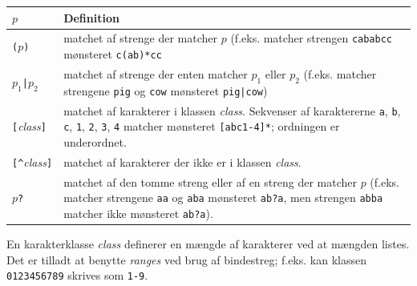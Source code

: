 \documentclass[rgb]{beamer}
\begin{document}
\begin{frame}[fragile]
\begin{footnotesize}

\begin{tabular}{lp{9cm}}
$p$ & {\bf Definition} \\[1ex] \hline
\texttt{(}$p$\texttt{)}    & matchet af strenge der matcher $p$ (f.eks. matcher strengen \texttt{cababcc} mønsteret \texttt{c(ab)*cc} \\[1ex]
$p_1$\texttt{|}$p_2$ & matchet af strenge der enten matcher $p_1$ eller $p_2$ (f.eks. matcher strengene \texttt{pig} og \texttt{cow} mønsteret \texttt{pig|cow}) \\[1ex]
\texttt{[}\emph{class}\texttt{]} & matchet af karakterer i klassen {\em class}.
 Sekvenser af karaktererne \texttt{a}, \texttt{b}, \texttt{c}, \texttt{1}, \texttt{2}, \texttt{3}, \texttt{4} matcher mønsteret \verb+[abc1-4]*+; ordningen er underordnet. \\[1ex]
\texttt{[\^}\emph{class}\texttt{]}      & matchet af karakterer der ikke er i klassen {\em class}. \\[1ex]
$p$\texttt{?} & matchet af den tomme streng eller af en streng der matcher $p$ (f.eks. matcher strengene \texttt{aa} og \texttt{aba} mønsteret \texttt{ab?a}, men strengen \texttt{abba} matcher ikke mønsteret \texttt{ab?a}).
\end{tabular}


En karakterklasse \emph{class} definerer en mængde af karakterer ved
at mængden listes. Det er tilladt at benytte \emph{ranges} ved brug af
bindestreg; f.eks. kan klassen \texttt{0123456789} skrives som
\texttt{1-9}.

\end{footnotesize}
\end{frame}
\end{document}
